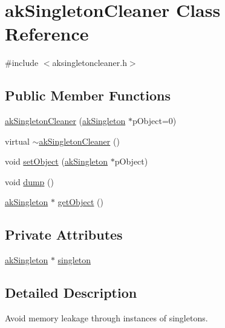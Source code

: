 \hypertarget{classakSingletonCleaner}{\section{ak\-Singleton\-Cleaner Class Reference}
\label{classakSingletonCleaner}
}


{\ttfamily \#include $<$aksingletoncleaner.\-h$>$}

\subsection*{Public Member Functions}
\begin{DoxyCompactItemize}
\item 
\hyperlink{classakSingletonCleaner_a32e58e12cf09e734bc193cc173109a11}{ak\-Singleton\-Cleaner} (\hyperlink{classakSingleton}{ak\-Singleton} $\ast$p\-Object=0)
\item 
virtual \hyperlink{classakSingletonCleaner_ac67a209ea9bcfa84b7023d0b883f2760}{$\sim$ak\-Singleton\-Cleaner} ()
\item 
void \hyperlink{classakSingletonCleaner_aec9467ff1fe3a122cdb0b2804de534f1}{set\-Object} (\hyperlink{classakSingleton}{ak\-Singleton} $\ast$p\-Object)
\item 
void \hyperlink{classakSingletonCleaner_a71f6982f436425a3ffd863831014241a}{dump} ()
\item 
\hyperlink{classakSingleton}{ak\-Singleton} $\ast$ \hyperlink{classakSingletonCleaner_ade327d63224d0a197643234112298313}{get\-Object} ()
\end{DoxyCompactItemize}
\subsection*{Private Attributes}
\begin{DoxyCompactItemize}
\item 
\hyperlink{classakSingleton}{ak\-Singleton} $\ast$ \hyperlink{classakSingletonCleaner_aae2ff315a00eb9214a6212e50feaab97}{singleton}
\end{DoxyCompactItemize}


\subsection{Detailed Description}
Avoid memory leakage through instances of singletons. 

